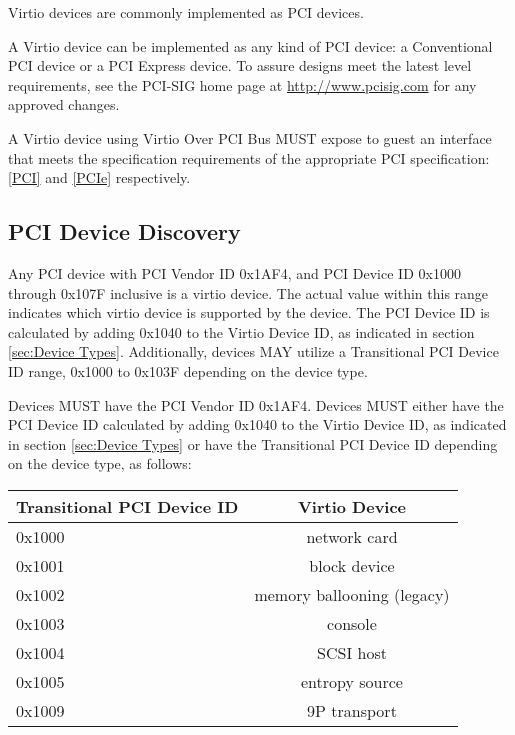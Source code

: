 Virtio devices are commonly implemented as PCI devices.

A Virtio device can be implemented as any kind of PCI device:
a Conventional PCI device or a PCI Express
device.  To assure designs meet the latest level
requirements, see 
the PCI-SIG home page at \url{http://www.pcisig.com} for any
approved changes.

A Virtio device using Virtio Over PCI Bus MUST expose to
guest an interface that meets the specification requirements of
the appropriate PCI specification: \hyperref[intro:PCI]{[PCI]}
and \hyperref[intro:PCIe]{[PCIe]}
respectively. 

\subsection{PCI Device Discovery}\label{sec:Virtio Transport Options / Virtio Over PCI Bus / PCI Device Discovery}

Any PCI device with PCI Vendor ID 0x1AF4, and PCI Device ID 0x1000 through
0x107F inclusive is a virtio device. The actual value within this range
indicates which virtio device is supported by the device.
The PCI Device ID is calculated by adding 0x1040 to the Virtio Device ID,
as indicated in section \ref{sec:Device Types}.
Additionally, devices MAY utilize a Transitional PCI Device ID range,
0x1000 to 0x103F depending on the device type.


Devices MUST have the PCI Vendor ID 0x1AF4.
Devices MUST either have the PCI Device ID calculated by adding 0x1040
to the Virtio Device ID, as indicated in section \ref{sec:Device
Types} or have the Transitional PCI Device ID depending on the device type,
as follows:

\begin{tabular}{|l|c|}
\hline
Transitional PCI Device ID  &  Virtio Device    \\
\hline \hline
0x1000      &   network card     \\
\hline
0x1001     &   block device     \\
\hline
0x1002     & memory ballooning (legacy)  \\
\hline
0x1003     &      console       \\
\hline
0x1004     &     SCSI host      \\
\hline
0x1005     &  entropy source    \\
\hline
0x1009     &   9P transport     \\
\hline
\end{tabular}

